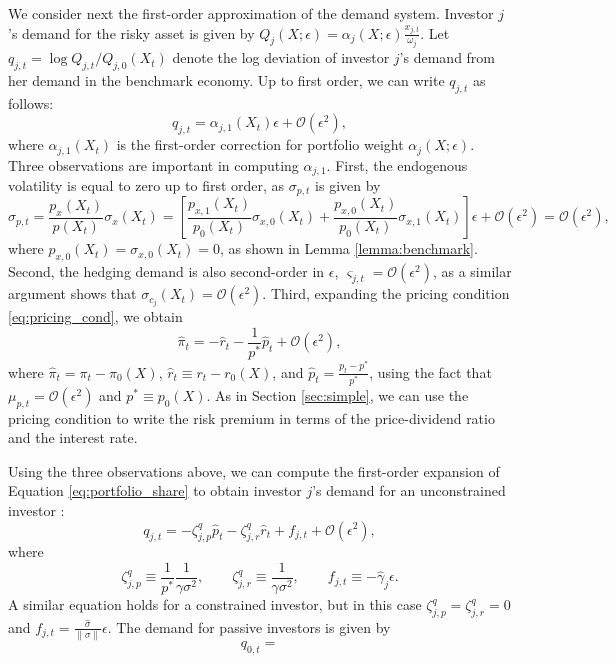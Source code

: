We consider next the first-order approximation of the demand system. 
Investor $j$'s demand for the risky asset is given by $Q_{j}(X;\epsilon) = \alpha_{j}(X;\epsilon) \frac{x_{j,t}}{\omega_{j}}.$ 
Let $q_{j,t} = \log Q_{j,t} / Q_{j,0}(X_t)$ denote the log deviation of investor $j$'s demand from her demand in the benchmark economy. Up to first order, we can write $q_{j,t}$ as follows:
\begin{equation}
    q_{j,t} = \alpha_{j,1}(X_t) \epsilon + \mathcal{O}(\epsilon^2),
\end{equation}
where $\alpha_{j,1}(X_t) $ is the first-order correction for portfolio weight $\alpha_j(X;\epsilon)$. Three observations are important in computing $\alpha_{j,1}$. First, the endogenous volatility is equal to zero up to first order, as $\sigma_{p,t}$ is given by 
\begin{equation}
    \sigma_{p,t} = \frac{p_x(X_t)}{p(X_t)} \sigma_x(X_t) = \left[ \frac{p_{x,1}(X_t)}{p_0(X_t)} \sigma_{x,0}(X_t) +\frac{p_{x,0}(X_t)}{p_0(X_t)} \sigma_{x,1}(X_t) \right] \epsilon + \mathcal{O}(\epsilon^2) = \mathcal{O}(\epsilon^2),
\end{equation}
where $p_{x,0}(X_t) = \sigma_{x,0}(X_t) = 0$, as shown in Lemma \ref{lemma:benchmark}. Second, the hedging demand is also second-order in $\epsilon$, $\varsigma_{j,t} = \mathcal{O}(\epsilon^2)$,
as a similar argument shows that $\sigma_{c_j}(X_t) = \mathcal{O}(\epsilon^2)$. Third, expanding the pricing condition \eqref{eq:pricing_cond}, we obtain
\begin{equation}
\hat{\pi}_t = - \hat{r}_t - \frac{1}{p^*} \hat{p}_t + \mathcal{O}(\epsilon^2),
\end{equation}
where $\hat{\pi}_t = \pi_t - \pi_0(X)$, $\hat{r}_t \equiv r_t - r_0(X)$, and $\hat{p}_t = \frac{p_t - p^*}{p^*}$, using the fact that $\mu_{p,t} = \mathcal{O}(\epsilon^2)$ and $p^* \equiv p_0(X)$. 
As in Section \ref{sec:simple}, we can use the pricing condition to write the risk premium in terms of the price-dividend ratio and the interest rate.

Using the three observations above, we can compute the first-order expansion of Equation \eqref{eq:portfolio_share} to obtain investor $j$'s demand for an unconstrained investor :
\begin{equation}
    q_{j,t} = -\zeta^q_{j, p} \hat{p}_t - \zeta^q_{j,r} \hat{r}_t + f_{j,t} + \mathcal{O}(\epsilon^2), 
\end{equation}
where $$\zeta_{j,p}^q \equiv \frac{1}{p^*} \frac{1}{\gamma \sigma^2}, \qquad \zeta_{j,r}^q \equiv \frac{1}{\gamma \sigma^2}, \qquad f_{j,t} \equiv -\hat{\gamma}_j \epsilon.$$ 
A similar equation holds for a constrained investor, but in this case $\zeta_{j,p}^q = \zeta_{j,r}^q = 0$ and $f_{j,t} = \frac{\hat{\sigma}}{\|\sigma\|} \epsilon$. 
The demand for passive investors is given by
\begin{equation}
    q_{0,t} = 
\end{equation}


